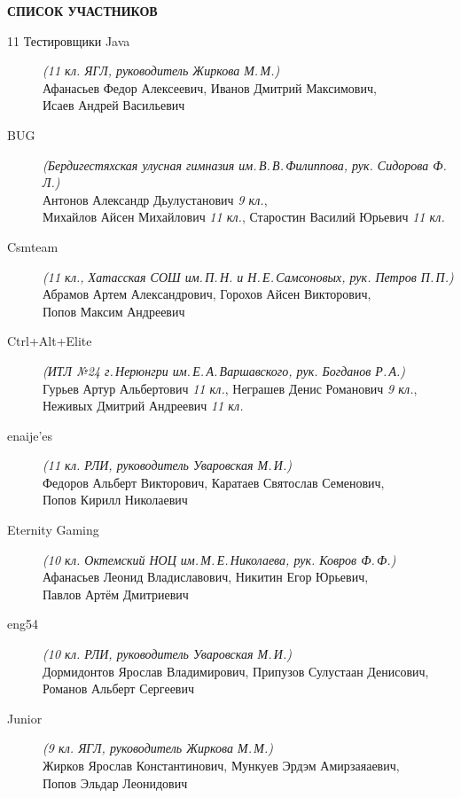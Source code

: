 \newpage
\noindent
\textbf{СПИСОК УЧАСТНИКОВ}
\begin{description}

\item[11 Тестировщики Java] \textit{(11 кл. ЯГЛ, руководитель Жиркова М.\,М.)} \\
Афанасьев Федор Алексеевич, Иванов Дмитрий Максимович, \\
Исаев Андрей Васильевич

\item[BUG] \textit{(Бердигестяхская улусная гимназия им.\,В.\,В.\,Филиппова, рук. Сидорова Ф.\,Л.)} \\
Антонов Александр Дьулустанович \textit{9 кл.}, \\
Михайлов Айсен Михайлович \textit{11 кл.}, Старостин Василий Юрьевич \textit{11 кл.}

\item[Csmteam] \textit{(11 кл., Хатасская СОШ им.\,П.\,Н. и Н.\,Е.\,Самсоновых, рук. Петров П.\,П.)} \\
Абрамов Артем Александрович, Горохов Айсен Викторович, \\
Попов Максим Андреевич

\item[Ctrl+Alt+Elite] \textit{(ИТЛ №24 г.\,Нерюнгри им.\,Е.\,А.\,Варшавского, рук. Богданов Р.\,А.)} \\
Гурьев Артур Альбертович \textit{11 кл.}, Неграшев Денис Романович \textit{9 кл.}, \\
Неживых Дмитрий Андреевич \textit{11 кл.}

\item[enaije'es] \textit{(11 кл. РЛИ, руководитель Уваровская М.\,И.)} \\
Федоров Альберт Викторович, Каратаев Святослав Семенович, \\
Попов Кирилл Николаевич

\item[Eternity Gaming] \textit{(10 кл. Октемский НОЦ им.\,М.\,Е.\,Николаева, рук. Ковров Ф.\,Ф.)} \\
Афанасьев Леонид Владиславович, Никитин Егор Юрьевич, \\
Павлов Артём Дмитриевич

\item[eng54] \textit{(10 кл. РЛИ, руководитель Уваровская М.\,И.)} \\
Дормидонтов Ярослав Владимирович, Припузов Сулустаан Денисович, \\
Романов Альберт Сергеевич

\item[Junior] \textit{(9 кл. ЯГЛ, руководитель Жиркова М.\,М.)} \\
Жирков Ярослав Константинович, Мункуев Эрдэм Амирзаяаевич, \\
Попов Эльдар Леонидович


\end{description}
